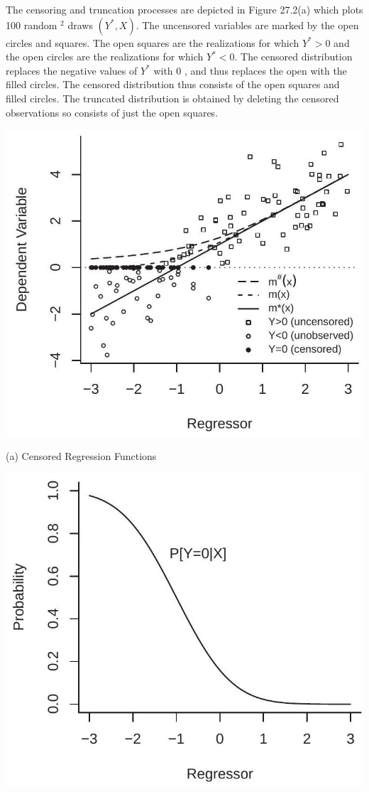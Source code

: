 \documentclass[10pt]{article}
\begin{document}
The censoring and truncation processes are depicted in Figure 27.2(a) which plots 100 random $^{2}$ draws $\left(Y^{*}, X\right)$. The uncensored variables are marked by the open circles and squares. The open squares are the realizations for which $Y^{*}>0$ and the open circles are the realizations for which $Y^{*}<0$. The censored distribution replaces the negative values of $Y^{*}$ with 0 , and thus replaces the open with the filled circles. The censored distribution thus consists of the open squares and filled circles. The truncated distribution is obtained by deleting the censored observations so consists of just the open squares.

\includegraphics[max width=\textwidth]{2022_10_23_36a5c875f975c7792a09g-03}

(a) Censored Regression Functions

\includegraphics[max width=\textwidth]{2022_10_23_36a5c875f975c7792a09g-03(1)}
\end{document}
